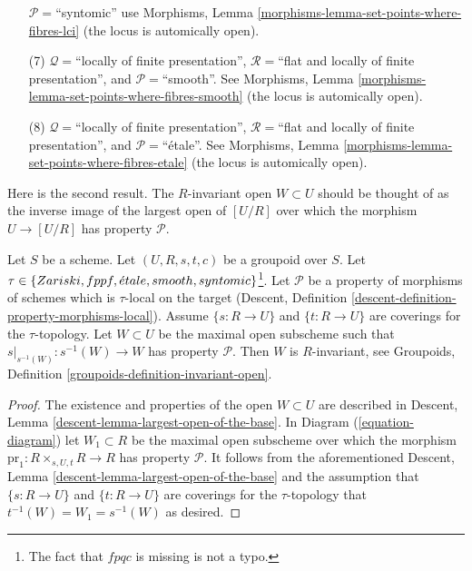 \begin{remark}
\begin{enumerate}
$\mathcal{P}=$``syntomic'' use
Morphisms, Lemma \ref{morphisms-lemma-set-points-where-fibres-lci}
(the locus is automically open).
\item[(7)] $\mathcal{Q} =$``locally of finite presentation'',
$\mathcal{R} =$``flat and locally of finite presentation'', and
$\mathcal{P}=$``smooth''. See
Morphisms, Lemma \ref{morphisms-lemma-set-points-where-fibres-smooth}
(the locus is automically open).
\item[(8)] $\mathcal{Q} =$``locally of finite presentation'',
$\mathcal{R} =$``flat and locally of finite presentation'', and
$\mathcal{P}=$``\'etale''. See
Morphisms, Lemma \ref{morphisms-lemma-set-points-where-fibres-etale}
(the locus is automically open).
\end{enumerate}
\end{remark}

\noindent
Here is the second result. The $R$-invariant open $W \subset U$ should be
thought of as the inverse image of the largest open of $[U/R]$ over which
the morphism $U \to [U/R]$ has property $\mathcal{P}$.

\begin{lemma}
\label{lemma-property-invariant}
Let $S$ be a scheme.
Let $(U, R, s, t, c)$ be a groupoid over $S$.
Let $\tau \in \{Zariski,\linebreak[0] fppf,
\linebreak[0] \acute{e}tale,\linebreak[0]
smooth,\linebreak[0] syntomic\}$\footnote{The fact that $fpqc$ is missing
is not a typo.}. Let $\mathcal{P}$ be a property of morphisms of schemes
which is $\tau$-local on the target
(Descent, Definition \ref{descent-definition-property-morphisms-local}).
Assume $\{s : R \to U\}$ and $\{t : R \to U\}$ are coverings for the
$\tau$-topology. Let $W \subset U$ be the maximal open subscheme such that
$s|_{s^{-1}(W)} : s^{-1}(W) \to W$ has property $\mathcal{P}$.
Then $W$ is $R$-invariant, see
Groupoids, Definition \ref{groupoids-definition-invariant-open}.
\end{lemma}

\begin{proof}
The existence and properties of the open $W \subset U$ are described in
Descent, Lemma \ref{descent-lemma-largest-open-of-the-base}.
In
Diagram (\ref{equation-diagram})
let $W_1 \subset R$ be the maximal open subscheme over which the morphism
$\text{pr}_1 : R \times_{s, U, t} R \to R$ has property $\mathcal{P}$.
It follows from the aforementioned
Descent, Lemma \ref{descent-lemma-largest-open-of-the-base}
and the assumption that $\{s : R \to U\}$ and $\{t : R \to U\}$ are coverings
for the $\tau$-topology that $t^{-1}(W) = W_1 = s^{-1}(W)$ as desired.
\end{proof}

